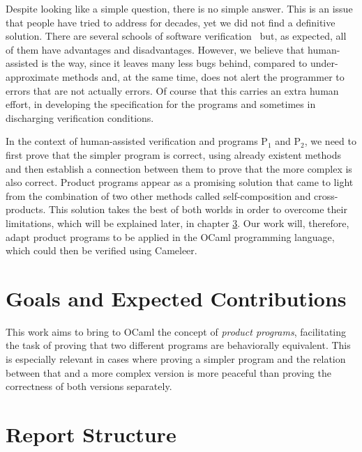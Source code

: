 Despite looking like a simple question, there is no simple answer.
This is an issue that people have tried to address for decades, yet we did not find a definitive solution.
There are several schools of software verification~\cite{DBLP:conf/fm/BrainP24} but, as expected, all of them have advantages and disadvantages.
However, we believe that human-assisted is the way, since it leaves many less bugs behind, compared to under-approximate methods and, at the same time, does not alert the programmer to errors that are not actually errors.
Of course that this carries an extra human effort, in developing the specification for the programs and sometimes in discharging verification conditions.

In the context of human-assisted verification and programs P$_1$ and P$_2$, we need to first prove that the simpler program is correct, using already existent methods and then establish a connection between them to prove that the more complex is also correct.
Product programs appear as a promising solution that came to light from the combination of two other methods called self-composition and cross-products.
This solution takes the best of both worlds in order to overcome their limitations, which will be explained later, in chapter \hyperref[cha:state_of_the_art]{3}.
Our work will, therefore, adapt product programs to be applied in the OCaml programming language, which could then be verified using Cameleer.


\section{Goals and Expected Contributions}

This work aims to bring to OCaml the concept of \emph{product programs}, facilitating the task of proving that two different programs are behaviorally equivalent.
This is especially relevant in cases where proving a simpler program and the relation between that and a more complex version is more peaceful than proving the correctness of both versions separately.


\section{Report Structure}

